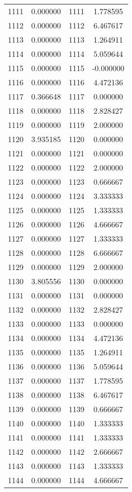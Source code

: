 \documentclass[12pt]{article}
\begin{document}
\begin{longtable}{@{}cccc@{}}
1111 & 0.000000 & 1111 & 1.778595 \\
1112 & 0.000000 & 1112 & 6.467617 \\
1113 & 0.000000 & 1113 & 1.264911 \\
1114 & 0.000000 & 1114 & 5.059644 \\
1115 & 0.000000 & 1115 & -0.000000 \\
1116 & 0.000000 & 1116 & 4.472136 \\
1117 & 0.366648 & 1117 & 0.000000 \\
1118 & 0.000000 & 1118 & 2.828427 \\
1119 & 0.000000 & 1119 & 2.000000 \\
1120 & 3.935185 & 1120 & 0.000000 \\
1121 & 0.000000 & 1121 & 0.000000 \\
1122 & 0.000000 & 1122 & 2.000000 \\
1123 & 0.000000 & 1123 & 0.666667 \\
1124 & 0.000000 & 1124 & 3.333333 \\
1125 & 0.000000 & 1125 & 1.333333 \\
1126 & 0.000000 & 1126 & 4.666667 \\
1127 & 0.000000 & 1127 & 1.333333 \\
1128 & 0.000000 & 1128 & 6.666667 \\
1129 & 0.000000 & 1129 & 2.000000 \\
1130 & 3.805556 & 1130 & 0.000000 \\
1131 & 0.000000 & 1131 & 0.000000 \\
1132 & 0.000000 & 1132 & 2.828427 \\
1133 & 0.000000 & 1133 & 0.000000 \\
1134 & 0.000000 & 1134 & 4.472136 \\
1135 & 0.000000 & 1135 & 1.264911 \\
1136 & 0.000000 & 1136 & 5.059644 \\
1137 & 0.000000 & 1137 & 1.778595 \\
1138 & 0.000000 & 1138 & 6.467617 \\
1139 & 0.000000 & 1139 & 0.666667 \\
1140 & 0.000000 & 1140 & 1.333333 \\
1141 & 0.000000 & 1141 & 1.333333 \\
1142 & 0.000000 & 1142 & 2.666667 \\
1143 & 0.000000 & 1143 & 1.333333 \\
1144 & 0.000000 & 1144 & 4.666667 \\

\end{longtable}
\end{document}
